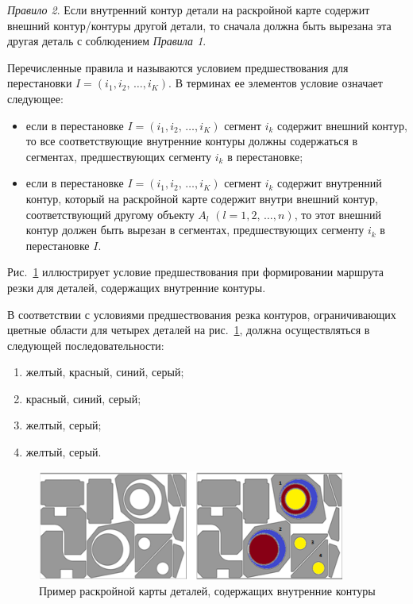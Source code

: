 \documentclass[11pt,twoside,openany]{report}
\begin{document}
{\it Правило 2}.
Если внутренний контур детали на раскройной карте
содержит внешний контур/контуры другой детали,
то сначала должна быть вырезана эта другая деталь
с соблюдением {\it Правила 1}.

Перечисленные правила и называются условием предшествования для перестановки
$ I = (i_1, i_2, \,\dots, i_K)$.
В терминах ее элементов условие означает следующее:
\begin{itemize}
  \item
  если в перестановке
  $ I = (i_1, i_2, \,\dots, i_K)$
  сегмент $i_k$
  содержит внешний контур,
  то все соответствующие внутренние контуры должны содержаться в сегментах,
  предшествующих сегменту $i_k$
  в перестановке;
  \item
  если в перестановке
  $ I = (i_1, i_2, \,\dots, i_K)$
  сегмент $i_k$
  содержит  внутренний контур,
  который на раскройной карте содержит внутри внешний контур,
  соответствующий другому объекту
  $A_l$
  $(l=1,2, \,\dots, n)$,
  то этот внешний контур должен быть вырезан в сегментах,
  предшествующих сегменту $i_k$ в перестановке $I$.
\end{itemize}

Рис.~\ref{precedence}
иллюстрирует условие предшествования
при формировании маршрута резки для деталей,
содержащих внутренние контуры.

В соответствии с условиями предшествования резка контуров,
ограничивающих цветные области для четырех деталей на
рис.~\ref{precedence},
должна осуществляться в следующей последовательности:
\begin{enumerate}
  \item желтый, красный, синий, серый;
  \item	красный, синий, серый;
  \item	желтый, серый;
  \item желтый, серый.
\end{enumerate}

\begin{figure}[h]
  \begin{center}
  \includegraphics[width=0.9\textwidth]{precedence.png}
  \caption{Пример раскройной карты деталей, содержащих внутренние контуры}
  \label{precedence}
  \end{center}
\end{figure}
\end{document}
